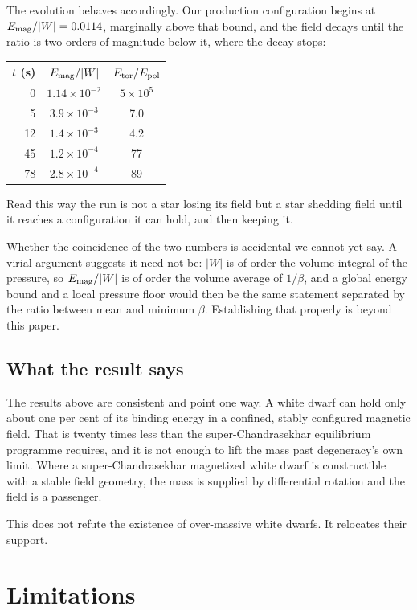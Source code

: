 \documentclass[twocolumn,linenumbers]{aastex701}
\newcommand{\Etor}{E_{\rm tor}}
\newcommand{\Epol}{E_{\rm pol}}
\begin{document}
The evolution behaves accordingly. Our production configuration begins at
$E_{\rm mag}/|W| = 0.0114$, marginally above that bound, and the field decays
until the ratio is two orders of magnitude below it, where the decay stops:

\begin{center}
\begin{tabular}{rcc}
\hline
$t$ (s) & $E_{\rm mag}/|W|$ & $\Etor/\Epol$ \\
\hline
 0 & $1.14\times10^{-2}$ & $5\times10^{5}$ \\
 5 & $3.9\times10^{-3}$ & 7.0 \\
12 & $1.4\times10^{-3}$ & 4.2 \\
45 & $1.2\times10^{-4}$ & 77 \\
78 & $2.8\times10^{-4}$ & 89 \\
\hline
\end{tabular}
\end{center}

Read this way the run is not a star losing its field but a star shedding field
until it reaches a configuration it can hold, and then keeping it.

Whether the coincidence of the two numbers is accidental we cannot yet say. A
virial argument suggests it need not be: $|W|$ is of order the volume integral
of the pressure, so $E_{\rm mag}/|W|$ is of order the volume average of
$1/\beta$, and a global energy bound and a local pressure floor would then be
the same statement separated by the ratio between mean and minimum $\beta$.
Establishing that properly is beyond this paper.

\subsection{What the result says}

The results above are consistent and point one way. A white dwarf can hold
only about one per cent of its binding energy in a confined, stably configured
magnetic field. That is twenty times less than the super-Chandrasekhar
equilibrium programme requires, and it is not enough to lift the mass past
degeneracy's own limit. Where a super-Chandrasekhar magnetized white dwarf is
constructible with a stable field geometry, the mass is supplied by
differential rotation and the field is a passenger.

This does not refute the existence of over-massive white dwarfs. It relocates
their support.

\section{Limitations} \label{sec:limitations}
\end{document}
